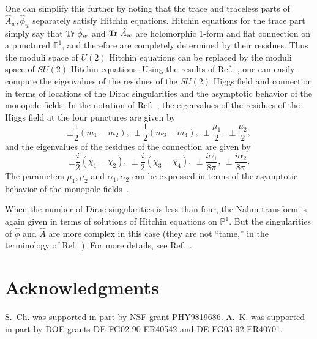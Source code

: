 \documentclass[a4paper,12pt, amsfonts, amssymb]{article}
\newcommand{\PP}{{\mathbb P}}
\newcommand{\Tr}{{\rm Tr}}
\newcommand{\hphi}{{\hat\phi}}
\newcommand{\hA}{{\hat A}}
\begin{document}
One can simplify this further
by noting that the trace and traceless parts of $\hA_w,\hphi_w$ separately
satisfy Hitchin equations. Hitchin equations for the trace part simply
say that $\Tr\ \hphi_w$ and $\Tr\ \hA_w$ are holomorphic 1-form and
flat connection on a punctured $\PP^1$, and therefore are completely
determined by their residues. Thus the moduli space
of $U(2)$ Hitchin equations can be replaced by the moduli space of
$SU(2)$ Hitchin equations. Using the results of Ref.~\cite{ustwo}, one can easily
compute the eigenvalues of the residues of the $SU(2)$ Higgs field and connection in terms of locations of the Dirac singularities and the asymptotic behavior of the monopole fields. In the notation of Ref.~\cite{ustwo}, the eigenvalues of the residues of the Higgs field at the four punctures are given by
$$
\pm\frac{1}{2}(m_1-m_2),\ \pm\frac{1}{2}(m_3-m_4),\ \pm\frac{\mu_1}{2},\
\pm\frac{\mu_2}{2},
$$
and the eigenvalues of the residues of the connection are given by
$$
\pm\frac{i}{2}(\chi_1-\chi_2),\ \pm\frac{i}{2}(\chi_3-\chi_4),\
\pm\frac{i\alpha_1}{8\pi},\ \pm\frac{i\alpha_2}{8\pi}.
$$
The parameters $\mu_1, \mu_2$ and $\alpha_1, \alpha_2$ can be expressed
in terms of the asymptotic behavior of the monopole fields~\cite{ustwo}.

When the number of Dirac singularities is less than four, the Nahm transform
is again given in terms of solutions of Hitchin equations on $\PP^1.$
But the singularities of $\hphi$ and $\hA$ are more complex in this case
(they are not ``tame,'' in the terminology of Ref.~\cite{Simpson}). For more
details, see Ref.~\cite{ustwo}.

\section*{Acknowledgments}
S.~Ch. was supported in part by NSF grant PHY9819686. A.~K. was supported
in part by DOE grants DE-FG02-90-ER40542 and DE-FG03-92-ER40701.
\end{document}
